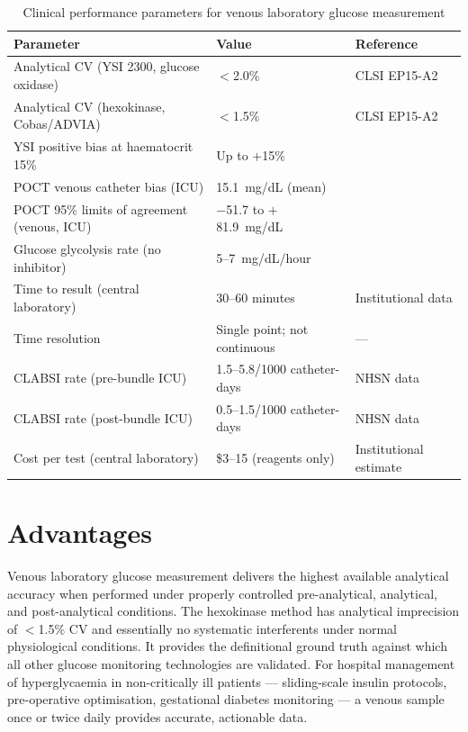 \begin{table}[H]
\centering
\caption{Clinical performance parameters for venous laboratory glucose measurement}
\label{tab:venous_stats}
\begin{tabular}{p{7.5cm}p{3.5cm}p{2.5cm}}
\toprule
\textbf{Parameter} & \textbf{Value} & \textbf{Reference} \\
\midrule
Analytical CV (YSI 2300, glucose oxidase) & $<$2.0\% & CLSI EP15-A2 \\
Analytical CV (hexokinase, Cobas/ADVIA) & $<$1.5\% & CLSI EP15-A2 \\
YSI positive bias at haematocrit 15\% & Up to $+$15\% & \cite{lyon2017hematocrit} \\
POCT venous catheter bias (ICU) & 15.1~mg/dL (mean) & \cite{inaccuracy2015} \\
POCT 95\% limits of agreement (venous, ICU) & $-$51.7 to $+$81.9~mg/dL & \cite{inaccuracy2015} \\
Glucose glycolysis rate (no inhibitor) & 5--7~mg/dL/hour & \cite{iso15197standard} \\
Time to result (central laboratory) & 30--60 minutes & Institutional data \\
Time resolution & Single point; not continuous & --- \\
CLABSI rate (pre-bundle ICU) & 1.5--5.8/1000 catheter-days & NHSN data \\
CLABSI rate (post-bundle ICU) & 0.5--1.5/1000 catheter-days & NHSN data \\
Cost per test (central laboratory) & \$3--15 (reagents only) & Institutional estimate \\
\bottomrule
\end{tabular}
\end{table}

\section{Advantages}

Venous laboratory glucose measurement delivers the highest available analytical accuracy when performed under properly controlled pre-analytical, analytical, and post-analytical conditions. The hexokinase method has analytical imprecision of $<$1.5\% CV and essentially no systematic interferents under normal physiological conditions. It provides the definitional ground truth against which all other glucose monitoring technologies are validated. For hospital management of hyperglycaemia in non-critically ill patients --- sliding-scale insulin protocols, pre-operative optimisation, gestational diabetes monitoring --- a venous sample once or twice daily provides accurate, actionable data.


